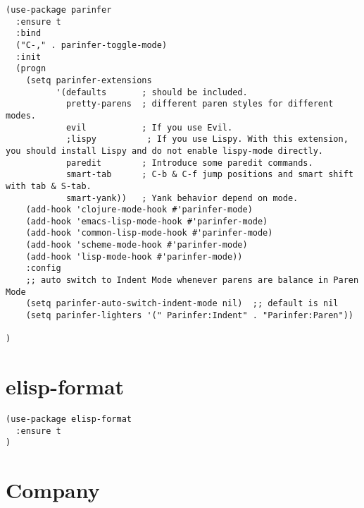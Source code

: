 \documentclass[11pt]{article}
\begin{document}
\begin{verbatim}
(use-package parinfer
  :ensure t
  :bind
  ("C-," . parinfer-toggle-mode)
  :init
  (progn
    (setq parinfer-extensions
          '(defaults       ; should be included.
            pretty-parens  ; different paren styles for different modes.
            evil           ; If you use Evil.
            ;lispy          ; If you use Lispy. With this extension, you should install Lispy and do not enable lispy-mode directly.
            paredit        ; Introduce some paredit commands.
            smart-tab      ; C-b & C-f jump positions and smart shift with tab & S-tab.
            smart-yank))   ; Yank behavior depend on mode.
    (add-hook 'clojure-mode-hook #'parinfer-mode)
    (add-hook 'emacs-lisp-mode-hook #'parinfer-mode)
    (add-hook 'common-lisp-mode-hook #'parinfer-mode)
    (add-hook 'scheme-mode-hook #'parinfer-mode)
    (add-hook 'lisp-mode-hook #'parinfer-mode))
    :config
    ;; auto switch to Indent Mode whenever parens are balance in Paren Mode
    (setq parinfer-auto-switch-indent-mode nil)  ;; default is nil
    (setq parinfer-lighters '(" Parinfer:Indent" . "Parinfer:Paren"))

)
\end{verbatim}

\section*{elisp-format}
\label{sec:org1c31439}

\begin{verbatim}
(use-package elisp-format
  :ensure t
)
\end{verbatim}

\section*{Company}
\label{sec:orgbc740a0}
\end{document}

